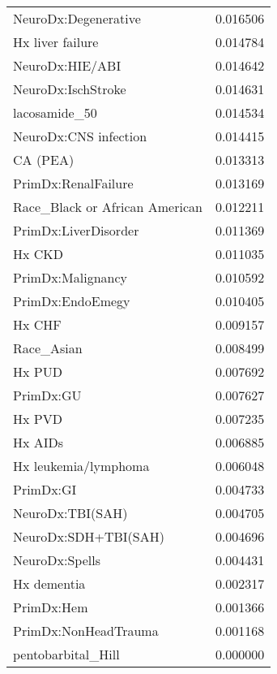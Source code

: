 \begin{tabular}{lr}
NeuroDx:Degenerative           &  0.016506 \\
Hx liver failure               &  0.014784 \\
NeuroDx:HIE/ABI                &  0.014642 \\
NeuroDx:IschStroke             &  0.014631 \\
lacosamide\_50                  &  0.014534 \\
NeuroDx:CNS infection          &  0.014415 \\
CA (PEA)                       &  0.013313 \\
PrimDx:RenalFailure            &  0.013169 \\
Race\_Black or African American &  0.012211 \\
PrimDx:LiverDisorder           &  0.011369 \\
Hx CKD                         &  0.011035 \\
PrimDx:Malignancy              &  0.010592 \\
PrimDx:EndoEmegy               &  0.010405 \\
Hx CHF                         &  0.009157 \\
Race\_Asian                     &  0.008499 \\
Hx PUD                         &  0.007692 \\
PrimDx:GU                      &  0.007627 \\
Hx PVD                         &  0.007235 \\
Hx AIDs                        &  0.006885 \\
Hx leukemia/lymphoma           &  0.006048 \\
PrimDx:GI                      &  0.004733 \\
NeuroDx:TBI(SAH)               &  0.004705 \\
NeuroDx:SDH+TBI(SAH)           &  0.004696 \\
NeuroDx:Spells                 &  0.004431 \\
Hx dementia                    &  0.002317 \\
PrimDx:Hem                     &  0.001366 \\
PrimDx:NonHeadTrauma           &  0.001168 \\
pentobarbital\_Hill             &  0.000000 \\
\bottomrule
\end{tabular}
